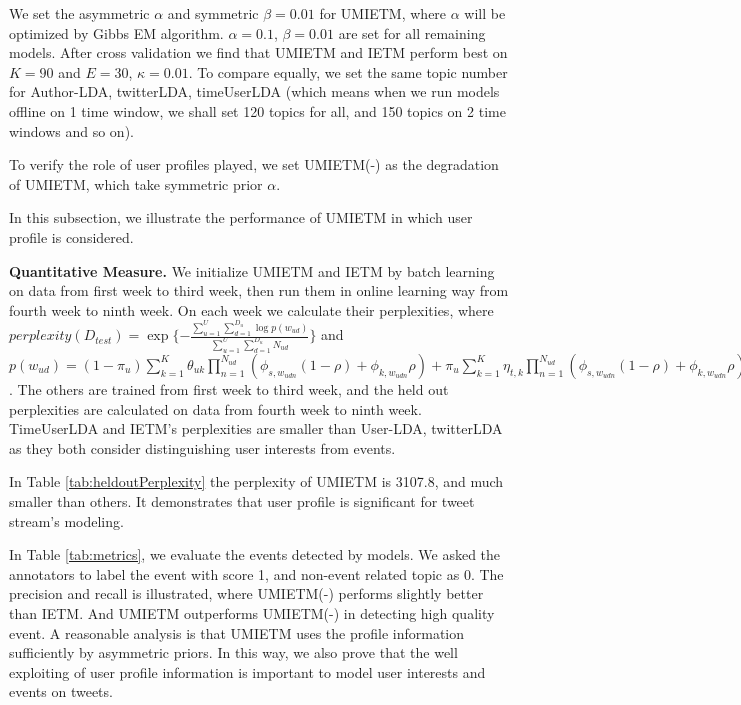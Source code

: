 \documentclass[conference,compsoc]{IEEEtran}
\begin{document}
We set the asymmetric \(\alpha\) and symmetric \(\beta=0.01\) for UMIETM, where \(\alpha\) will be optimized by Gibbs EM algorithm\cite{wallach2008structured}.
\(\alpha=0.1\), \(\beta=0.01\) are set for all remaining models. 
After cross validation we find that UMIETM and IETM perform best on \(K=90\) and \(E=30\), \(\kappa=0.01\).
To compare equally, we set the same topic number for Author-LDA, twitterLDA, timeUserLDA (which means when we run models offline on 1 time window, we shall set 120 topics for all, and 150 topics on 2 time windows and so on).

To verify the role of user profiles played, we set UMIETM(-) as the degradation of UMIETM, which take symmetric prior \(\alpha\).

In this subsection, we illustrate the performance of UMIETM in which user profile is considered.

\textbf{Quantitative Measure.}
We initialize UMIETM and IETM by batch learning on data from first week to third week, then run them in online learning way from fourth week to ninth week.
On each week we calculate their perplexities\cite{wallach2009evaluation}, where \(perplexity(D_{test})=\exp{\{-\frac{\sum_{u=1}^{U}\sum_{d=1}^{D_u}\log{p(w_{ud})}}{\sum_{u=1}^{U}\sum_{d=1}^{D_u}N_{ud}}\}}\) and \(p(w_{ud})=(1-\pi_u)\sum_{k=1}^{K}\theta_{uk}\prod_{n=1}^{N_{ud}}(\phi_{s,w_{udn}}(1-\rho)+\phi_{k,w_{udn}}\rho)+\pi_u \sum_{k=1}^{K}\eta_{t,k}\prod_{n=1}^{N_{ud}}(\phi_{s,w_{udn}}(1-\rho)+\phi_{k,w_{udn}}\rho)\).
The others are trained from first week to third week, and the held out perplexities are calculated on data from fourth week to ninth week.
TimeUserLDA and IETM's perplexities are smaller than User-LDA, twitterLDA as they both consider distinguishing user interests from events.

In Table \ref{tab:heldoutPerplexity} the perplexity of UMIETM is 3107.8, and much smaller than others. It demonstrates that user profile is significant for tweet stream's modeling.

In Table \ref{tab:metrics}, we evaluate the events detected by models. We asked the annotators to label the event with score 1, and non-event related topic as 0. 
The precision and recall is illustrated, where UMIETM(-) performs slightly better than IETM. 
And UMIETM outperforms UMIETM(-) in detecting high quality event. 
A reasonable analysis is that UMIETM uses the profile information sufficiently by asymmetric priors. 
In this way, we also prove that the well exploiting of user profile information is important to model user interests and events on tweets. 
\end{document}
